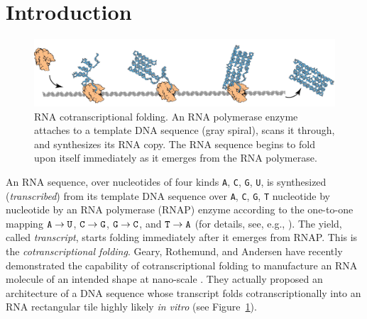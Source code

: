 	\section{Introduction}

\begin{figure}[htb]
\centering
\includegraphics[width=\linewidth]{pic/rna_origami.pdf}
\caption{RNA cotranscriptional folding. 
An RNA polymerase enzyme attaches to a template DNA sequence (gray spiral), scans it through, and synthesizes its RNA copy. 
The RNA sequence begins to fold upon itself immediately as it emerges from the RNA polymerase. 
}
\label{fig:rna_origami}
\end{figure}

An RNA sequence, over nucleotides of four kinds {\tt A}, {\tt C}, {\tt G}, {\tt U}, is synthesized (\textit{transcribed}) from its template DNA sequence over {\tt A}, {\tt C}, {\tt G}, {\tt T} nucleotide by nucleotide by an RNA polymerase (RNAP) enzyme according to the one-to-one mapping ${\tt A} \to {\tt U}$, ${\tt C} \to {\tt G}$, ${\tt G} \to {\tt C}$, and ${\tt T} \to {\tt A}$ (for details, see, e.g., \cite{AJLMRRW2014}). 
The yield, called \textit{transcript}, starts folding immediately after it emerges from RNAP. 
This is the \textit{cotranscriptional folding}. 
Geary, Rothemund, and Andersen have recently demonstrated the capability of cotranscriptional folding to manufacture an RNA molecule of an intended shape at nano-scale \cite{GearyRothemundAndersen2014}. 
They actually proposed an architecture of a DNA sequence whose transcript folds cotranscriptionally into an RNA rectangular tile highly likely \textit{in vitro} (see Figure~\ref{fig:rna_origami}). 

